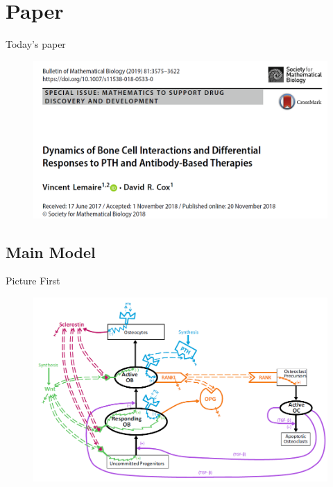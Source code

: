 \documentclass{beamer}
\begin{document}
\section{Paper}
\begin{frame}{Today's paper}
	\begin{figure}[h]
		\centering
			\includegraphics[scale=0.4]{../Figures/lemaire_paper_2019.png}
	\end{figure}
\end{frame}

\subsection{Main Model}
\begin{frame}{Picture First}
		\begin{figure}[h]
		\centering
			\includegraphics[scale=0.5]{../Figures/fig_lemaire_fig1.png}
	\end{figure}
\end{frame}
\end{document}

